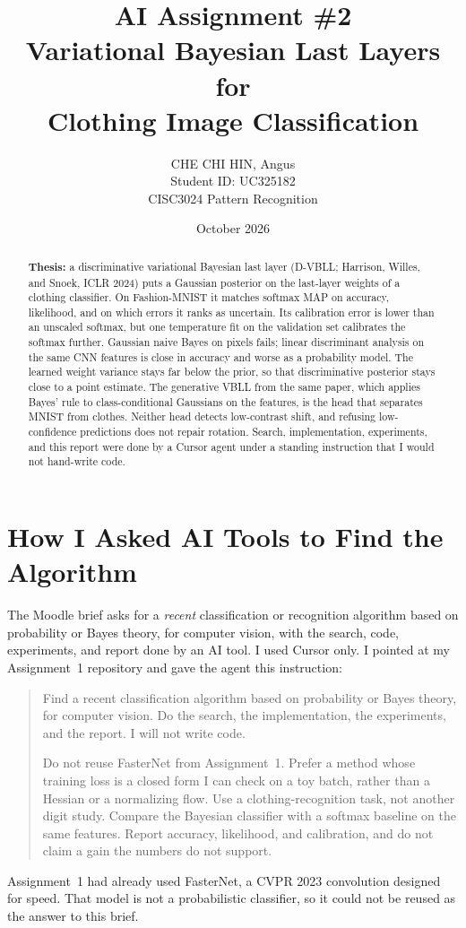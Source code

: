 \documentclass[11pt,a4paper]{article}
\title{\textbf{AI Assignment \#2}\\[0.25em]
\large Variational Bayesian Last Layers for\\
Clothing Image Classification}
\author{CHE CHI HIN, Angus\\Student ID: UC325182\\CISC3024 Pattern Recognition}
\date{October 2026}
\begin{document}
\maketitle
\thispagestyle{fancy}

\begin{abstract}
\textbf{Thesis:} a discriminative variational Bayesian last layer (D-VBLL; Harrison, Willes, and Snoek, ICLR 2024) puts a Gaussian posterior on the last-layer weights of a clothing classifier.
On Fashion-MNIST it matches softmax MAP on accuracy, likelihood, and on which errors it ranks as uncertain.
Its calibration error is lower than an unscaled softmax, but one temperature fit on the validation set calibrates the softmax further.
Gaussian naive Bayes on pixels fails; linear discriminant analysis on the same CNN features is close in accuracy and worse as a probability model.
The learned weight variance stays far below the prior, so that discriminative posterior stays close to a point estimate.
The generative VBLL from the same paper, which applies Bayes' rule to class-conditional Gaussians on the features, is the head that separates MNIST from clothes.
Neither head detects low-contrast shift, and refusing low-confidence predictions does not repair rotation.
Search, implementation, experiments, and this report were done by a Cursor agent under a standing instruction that I would not hand-write code.
\end{abstract}

\section{How I Asked AI Tools to Find the Algorithm}
The Moodle brief asks for a \emph{recent} classification or recognition algorithm based on probability or Bayes theory, for computer vision, with the search, code, experiments, and report done by an AI tool.
I used Cursor only. I pointed at my Assignment~1 repository and gave the agent this instruction:
\begin{quote}
\small
Find a recent classification algorithm based on probability or Bayes theory, for computer vision. Do the search, the implementation, the experiments, and the report. I will not write code.

Do not reuse FasterNet from Assignment~1. Prefer a method whose training loss is a closed form I can check on a toy batch, rather than a Hessian or a normalizing flow. Use a clothing-recognition task, not another digit study. Compare the Bayesian classifier with a softmax baseline on the same features. Report accuracy, likelihood, and calibration, and do not claim a gain the numbers do not support.
\end{quote}
Assignment~1 had already used FasterNet, a CVPR 2023 convolution designed for speed.
That model is not a probabilistic classifier, so it could not be reused as the answer to this brief.
\end{document}
